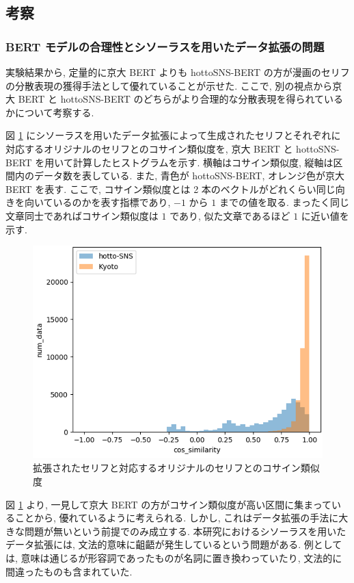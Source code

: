 \newpage
\changeindent{0cm}
\subsection{考察}
\changeindent{2cm}

\changeindent{0cm}
\subsubsection{BERT モデルの合理性とシソーラスを用いたデータ拡張の問題}
\changeindent{2cm}

実験結果から, 定量的に京大 BERT よりも hottoSNS-BERT の方が漫画のセリフの分散表現の獲得手法として優れていることが示せた. ここで, 別の視点から京大 BERT と hottoSNS-BERT のどちらがより合理的な分散表現を得られているかについて考察する.

図 \ref{fig:cos_bert} にシソーラスを用いたデータ拡張によって生成されたセリフとそれぞれに対応するオリジナルのセリフとのコサイン類似度を, 京大 BERT と hottoSNS-BERT を用いて計算したヒストグラムを示す. 横軸はコサイン類似度, 縦軸は区間内のデータ数を表している. また, 青色が hottoSNS-BERT, オレンジ色が京大 BERT を表す. ここで, コサイン類似度とは 2 本のベクトルがどれくらい同じ向きを向いているのかを表す指標であり, $-1$ から $1$ までの値を取る. まったく同じ文章同士であればコサイン類似度は $1$ であり, 似た文章であるほど $1$ に近い値を示す.

\begin{figure}[!h]
  \centering
  \includegraphics[width=0.8\hsize]{doc/figures/cos_bert.png}
  \caption{拡張されたセリフと対応するオリジナルのセリフとのコサイン類似度}
  \label{fig:cos_bert}
\end{figure}

\newpage
図 \ref{fig:cos_bert} より, 一見して京大 BERT の方がコサイン類似度が高い区間に集まっていることから, 優れているように考えられる. しかし, これはデータ拡張の手法に大きな問題が無いという前提でのみ成立する. 本研究におけるシソーラスを用いたデータ拡張には, 文法的意味に齟齬が発生しているという問題がある. 例としては, 意味は通じるが形容詞であったものが名詞に置き換わっていたり, 文法的に間違ったものも含まれていた.

